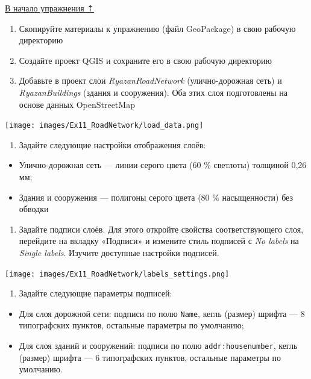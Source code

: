\documentclass[
  12pt,
]{book}
\providecommand{\tightlist}{%
  \setlength{\itemsep}{0pt}\setlength{\parskip}{0pt}}
\begin{document}
\protect\hyperlink{networks}{В начало упражнения ⇡}

\begin{enumerate}
\def\labelenumi{\arabic{enumi}.}
\item
  Скопируйте материалы к упражнению (файл GeoPackage) в свою рабочую директорию
\item
  Создайте проект QGIS и сохраните его в свою рабочую директорию
\item
  Добавьте в проект слои \emph{RyazanRoadNetwork} (улично-дорожная сеть) и \emph{RyazanBuildings} (здания и сооружения). Оба этих слоя подготовлены на основе данных OpenStreetMap
\end{enumerate}

\texttt{[image: images/Ex11\_RoadNetwork/load\_data.png]}

\begin{enumerate}
\def\labelenumi{\arabic{enumi}.}
\setcounter{enumi}{3}
\tightlist
\item
  Задайте следующие настройки отображения слоёв:
\end{enumerate}

\begin{itemize}
\tightlist
\item
  Улично-дорожная сеть --- линии серого цвета (60 \% светлоты) толщиной 0,26 мм;
\item
  Здания и сооружения --- полигоны серого цвета (80 \% насыщенности) без обводки
\end{itemize}

\begin{enumerate}
\def\labelenumi{\arabic{enumi}.}
\setcounter{enumi}{4}
\tightlist
\item
  Задайте подписи слоёв. Для этого откройте свойства соответствующего слоя, перейдите на вкладку «Подписи» и измените стиль подписей с \emph{No labels} на \emph{Single labels}. Изучите доступные настройки подписей.
\end{enumerate}

\texttt{[image: images/Ex11\_RoadNetwork/labels\_settings.png]}

\begin{enumerate}
\def\labelenumi{\arabic{enumi}.}
\setcounter{enumi}{5}
\tightlist
\item
  Задайте следующие параметры подписей:
\end{enumerate}

\begin{itemize}
\tightlist
\item
  Для слоя дорожной сети: подписи по полю \texttt{Name}, кегль (размер) шрифта --- 8 типографских пунктов, остальные параметры по умолчанию;
\item
  Для слоя зданий и сооружений: подписи по полю \texttt{addr:housenumber}, кегль (размер) шрифта --- 6 типографских пунктов, остальные параметры по умолчанию.
\end{itemize}
\end{document}
